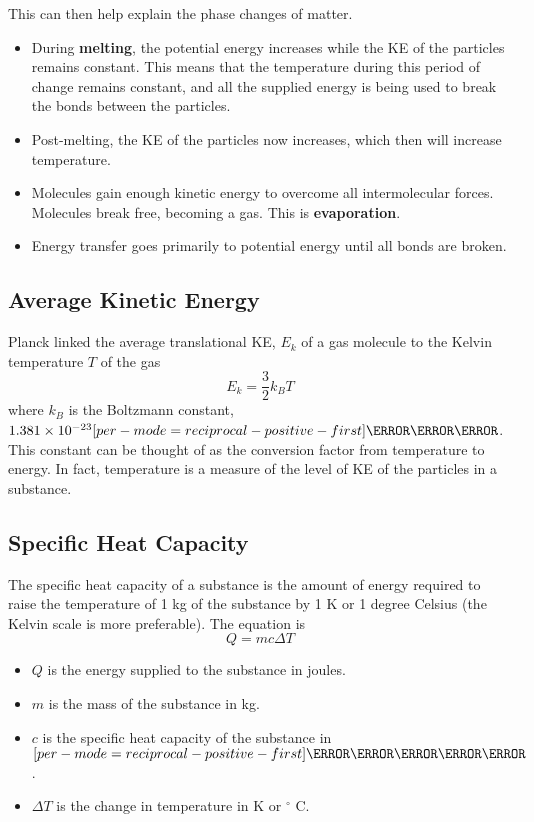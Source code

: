 \documentclass[a4paper,12pt]{article}
\let\oldsi\si
\renewcommand{\si}[1]{\oldsi[per-mode=reciprocal-positive-first]{#1}}
\newcommand{\degsym}{^{\circ}}
\begin{document}
This can then help explain the phase changes of matter.
\begin{itemize}
  \item During \textbf{melting}, the potential energy increases while the KE of the particles remains constant. This means that the temperature during this period of change remains constant, and all the supplied energy is being used to break the bonds between the particles.
  \item Post-melting, the KE of the particles now increases, which then will increase temperature.
  \item Molecules gain enough kinetic energy to overcome all intermolecular forces. Molecules break free, becoming a gas. This is \textbf{evaporation}.
  \item Energy transfer goes primarily to potential energy until all bonds are broken.
\end{itemize}

\subsection{Average Kinetic Energy}

Planck linked the average translational KE, $E_k$ of a gas molecule to the Kelvin temperature $T$ of the gas
$$E_k = \frac{3}{2}k_BT$$
where $k_B$ is the Boltzmann constant, $1.381 \times 10^{-23} \si{\joule\per\kelvin}$.
This constant can be thought of as the conversion factor from temperature to energy. In fact, temperature is a measure of the level of KE of the particles in a substance.

\pagebreak

\subsection{Specific Heat Capacity}

The specific heat capacity of a substance is the amount of energy required to raise the temperature of 1 kg of the substance by 1 K or 1 degree Celsius (the Kelvin scale is more preferable). The equation is
$$Q = mc\Delta T$$
\begin{itemize}
  \item  $Q$ is the energy supplied to the substance in joules.
  \item $m$ is the mass of the substance in kg.
  \item $c$ is the specific heat capacity of the substance in $\si{\joule\per\kilogram\per\kelvin}$.
  \item $\Delta T$ is the change in temperature in K or $\degsym$ C.
\end{itemize}
\end{document}
